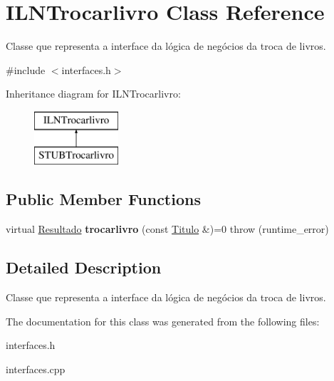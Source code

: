 \hypertarget{classILNTrocarlivro}{}\section{I\+L\+N\+Trocarlivro Class Reference}
\label{classILNTrocarlivro}


Classe que representa a interface da lógica de negócios da troca de livros.  




{\ttfamily \#include $<$interfaces.\+h$>$}

Inheritance diagram for I\+L\+N\+Trocarlivro\+:\begin{figure}[H]
\begin{center}
\leavevmode
\includegraphics[height=2.000000cm]{classILNTrocarlivro}
\end{center}
\end{figure}
\subsection*{Public Member Functions}
\begin{DoxyCompactItemize}
\item 
\mbox{\label{classILNTrocarlivro_a01c734c2dde5fd2ed32b0bb873afc4a0}} 
virtual \hyperlink{classResultado}{Resultado} {\bfseries trocarlivro} (const \hyperlink{classTitulo}{Titulo} \&)=0  throw (runtime\+\_\+error)
\end{DoxyCompactItemize}


\subsection{Detailed Description}
Classe que representa a interface da lógica de negócios da troca de livros. 

The documentation for this class was generated from the following files\+:\begin{DoxyCompactItemize}
\item 
interfaces.\+h\item 
interfaces.\+cpp\end{DoxyCompactItemize}
